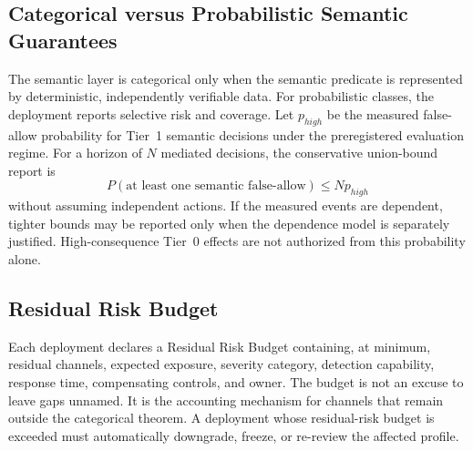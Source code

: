 \documentclass[11pt]{article}
\begin{document}
\subsection{Categorical versus Probabilistic Semantic Guarantees}
The semantic layer is categorical only when the semantic predicate is represented by deterministic, independently verifiable data. For probabilistic classes, the deployment reports selective risk and coverage. Let \(p_{high}\) be the measured false-allow probability for Tier~1 semantic decisions under the preregistered evaluation regime. For a horizon of \(N\) mediated decisions, the conservative union-bound report is
\[
P(\text{at least one semantic false-allow})\le Np_{high}
\]
without assuming independent actions. If the measured events are dependent, tighter bounds may be reported only when the dependence model is separately justified. High-consequence Tier~0 effects are not authorized from this probability alone.

\subsection{Residual Risk Budget}
Each deployment declares a Residual Risk Budget containing, at minimum, residual channels, expected exposure, severity category, detection capability, response time, compensating controls, and owner. The budget is not an excuse to leave gaps unnamed. It is the accounting mechanism for channels that remain outside the categorical theorem. A deployment whose residual-risk budget is exceeded must automatically downgrade, freeze, or re-review the affected profile.

\newpage
\end{document}
